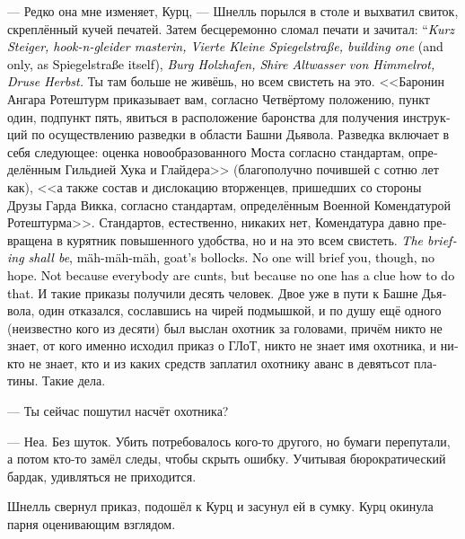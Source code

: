 \documentclass[a4paper,12pt,fleqn]{book}\usepackage{cooltooltips}\usepackage{polyglossia}\setdefaultlanguage[babelshorthands=true]{russian}\setotherlanguage{english}\defaultfontfeatures{Ligatures=TeX,Mapping=tex-text} \usepackage{xcolor}\definecolor{lightgray}{HTML}{bbbbbb}\color{lightgray}\newcommand{\ml}[3]{\textenglish{\textcolor{black}{#3}}}
\begin{document}
--- Редко она мне изменяет, Курц, --- Шнелль порылся в столе и выхватил свиток, скреплённый кучей печатей.
Затем бесцеремонно сломал печати и зачитал:
\ml{$0$}
{--- <<Курц Штайгер, мастер хука и глайдера, адрес проживания Фирте Кляйне Шпигельштрассе, дом первый>> (и единственный, как и сама Шпигельштрассе), <<бург Хольцхафен, земля Альтвассер фон Химмельрот, Друза Хербст>>.}
{``\textit{Kurz Steiger, hook-n-gleider masterin, Vierte Kleine Spiegelstraße, building one} (and only, as Spiegelstraße itself), \textit{Burg Holzhafen, Shire Altwasser von Himmelrot, Druse Herbst.}}
Ты там больше не живёшь, но всем свистеть на это.
<<Баронин Ангара Ротештурм приказывает вам, согласно Четвёртому положению, пункт один, подпункт пять, явиться в расположение баронства для получения инструкций по осуществлению разведки в области Башни Дьявола.
Разведка включает в себя следующее: оценка новообразованного Моста согласно стандартам, определённым Гильдией Хука и Глайдера>> (благополучно почившей с сотню лет как), <<а также состав и дислокацию вторженцев, пришедших со стороны Друзы Гарда Викка, согласно стандартам, определённым Военной Комендатурой Ротештурма>>.
Стандартов, естественно, никаких нет, Комендатура давно превращена в курятник повышенного удобства, но и на это всем свистеть.
\ml{$0$}
{<<Инструктаж должен быть осуществлён>>, мя-мя-мя, козьи яйца.}
{\textit{The briefing shall be}, mäh-mäh-mäh, goat's bollocks.}
\ml{$0$}
{Инструктировать тебя никто не будет, даже не надейся.}
{No one will brief you, though, no hope.}
\ml{$0$}
{Не потому что все такие вредные, а потому что никто понятия не имеет, как тебя инструктировать.}
{Not because everybody are cunts, but because no one has a clue how to do that.}
И такие приказы получили десять человек.
Двое уже в пути к Башне Дьявола, один отказался, сославшись на чирей подмышкой, и по душу ещё одного (неизвестно кого из десяти) был выслан охотник за головами, причём никто не знает, от кого именно исходил приказ о ГЛоТ, никто не знает имя охотника, и никто не знает, кто и из каких средств заплатил охотнику аванс в девятьсот платины.
Такие дела.

--- Ты сейчас пошутил насчёт охотника?

--- Неа.
Без шуток.
Убить потребовалось кого-то другого, но бумаги перепутали, а потом кто-то замёл следы, чтобы скрыть ошибку.
Учитывая бюрократический бардак, удивляться не приходится.

Шнелль свернул приказ, подошёл к Курц и засунул ей в сумку.
Курц окинула парня оценивающим взглядом.
\end{document}
